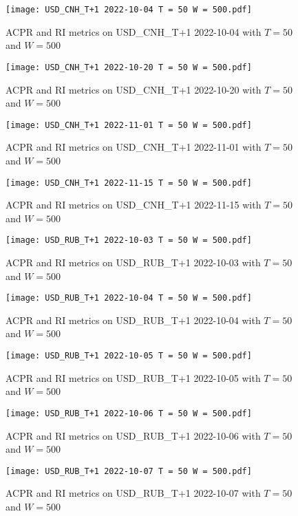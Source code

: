 \begin{figure}[htbp]
	\texttt{[image: USD\_CNH\_T+1 2022-10-04 T = 50 W = 500.pdf]}
	\caption{ACPR and RI metrics on USD\_CNH\_T+1 2022-10-04 with $T = 50$ and $W = 500$}
\end{figure}

\begin{figure}[htbp]
	\texttt{[image: USD\_CNH\_T+1 2022-10-20 T = 50 W = 500.pdf]}
	\caption{ACPR and RI metrics on USD\_CNH\_T+1 2022-10-20 with $T = 50$ and $W = 500$}
\end{figure}

\begin{figure}[htbp]
	\texttt{[image: USD\_CNH\_T+1 2022-11-01 T = 50 W = 500.pdf]}
	\caption{ACPR and RI metrics on USD\_CNH\_T+1 2022-11-01 with $T = 50$ and $W = 500$}
\end{figure}

\begin{figure}[htbp]
	\texttt{[image: USD\_CNH\_T+1 2022-11-15 T = 50 W = 500.pdf]}
	\caption{ACPR and RI metrics on USD\_CNH\_T+1 2022-11-15 with $T = 50$ and $W = 500$}
\end{figure}

\begin{figure}[htbp]
	\texttt{[image: USD\_RUB\_T+1 2022-10-03 T = 50 W = 500.pdf]}
	\caption{ACPR and RI metrics on USD\_RUB\_T+1 2022-10-03 with $T = 50$ and $W = 500$}
\end{figure}

\begin{figure}[htbp]
	\texttt{[image: USD\_RUB\_T+1 2022-10-04 T = 50 W = 500.pdf]}
	\caption{ACPR and RI metrics on USD\_RUB\_T+1 2022-10-04 with $T = 50$ and $W = 500$}
\end{figure}

\begin{figure}[htbp]
	\texttt{[image: USD\_RUB\_T+1 2022-10-05 T = 50 W = 500.pdf]}
	\caption{ACPR and RI metrics on USD\_RUB\_T+1 2022-10-05 with $T = 50$ and $W = 500$}
\end{figure}

\begin{figure}[htbp]
	\texttt{[image: USD\_RUB\_T+1 2022-10-06 T = 50 W = 500.pdf]}
	\caption{ACPR and RI metrics on USD\_RUB\_T+1 2022-10-06 with $T = 50$ and $W = 500$}
\end{figure}

\begin{figure}[htbp]
	\texttt{[image: USD\_RUB\_T+1 2022-10-07 T = 50 W = 500.pdf]}
	\caption{ACPR and RI metrics on USD\_RUB\_T+1 2022-10-07 with $T = 50$ and $W = 500$}
\end{figure}

